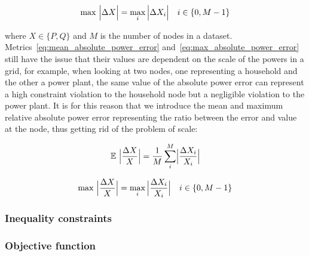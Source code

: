 \begin{equation}
    \label{eq:max_absolute_power_error}
    \max \ \Bigl| \Delta X \Bigr| = \max_i{\Bigl| \Delta X_i \Bigr|} \quad i \in \{0, M - 1\}
\end{equation}

\noindent where $X \in \{P, Q\}$ and $M$ is the number of nodes in a dataset. \\

Metrics~\ref{eq:mean_absolute_power_error} and~\ref{eq:max_absolute_power_error} still
have the issue that their values are dependent on the scale of the powers in a grid, for example,
when looking at two nodes, one representing a household and the other a power plant, the same
value of the absolute power error can represent a high constraint violation to the household
node but a negligible violation to the power plant.
It is for this reason that we introduce the mean and maximum relative absolute power error representing
the ratio between the error and value at the node, thus getting rid of the problem of scale:

\begin{equation}
    \label{eq:mean_relative_absolute_power_error}
    \mathbb{E} \ \Bigl| \frac{\Delta X}{X} \Bigr| = \frac{1}{M} \sum_i^{M} \Bigl| \frac{\Delta X_i}{X_i} \Bigr|
\end{equation}

\begin{equation}
    \label{eq:max_relative_absolute_power_error}
    \max \ \Bigl| \frac{\Delta X}{X} \Bigr| = \max_i{\Bigl| \frac{\Delta X_i}{X_i} \Bigr|} \quad i \in \{0, M - 1\}
\end{equation}

\subsubsection*{Inequality constraints}
\subsubsection*{Objective function}